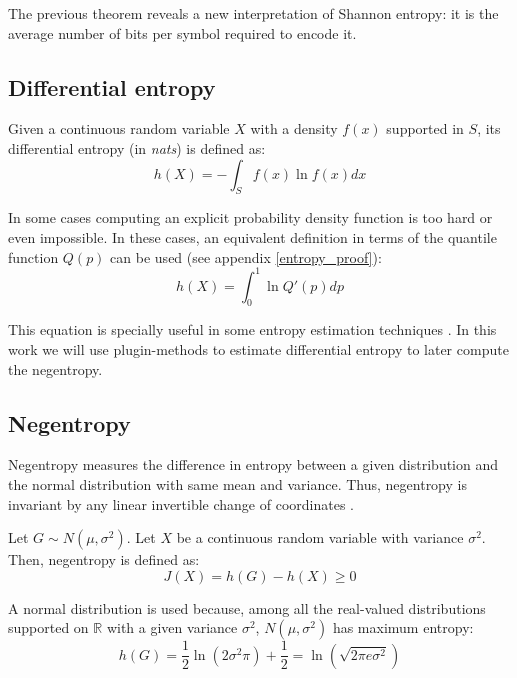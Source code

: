 The previous theorem reveals a new interpretation of Shannon entropy: it is the average number of bits per symbol required to encode it.

\subsection{Differential entropy}
Given a continuous random variable $X$ with a density $f(x)$ supported in $S$, its differential entropy (in \textit{nats}) is defined as:
\begin{equation} \label{eq:differential_entropy}
h(X) = - \int_{S}^{} f(x) \ln f(x) dx
\end{equation}

In some cases computing an explicit probability density function is too hard or even impossible. In these cases, an equivalent definition in terms of the quantile function $Q(p)$ can be used (see appendix \ref{entropy_proof}):
\begin{equation} \label{eq:differential_entropy_q}
h(X) = \int_{0}^{1} \ln Q'(p) dp
\end{equation}

This equation is specially useful in some entropy estimation techniques \parencite{Vasicek}. In this work we will use plugin-methods \parencite{EntropyEstimation} to estimate differential entropy to later compute the negentropy.

\subsection{Negentropy}
Negentropy measures the difference in entropy between a given distribution and the normal distribution with same mean and variance. Thus, negentropy is invariant by any linear invertible change of coordinates \parencite{negentropy}. 

Let $G \sim N(\mu, \sigma^2)$. Let $X$ be a continuous random variable with variance $\sigma^2$. Then, negentropy is defined as:
\begin{equation}
J(X) = h(G) - h(X) \geq 0
\end{equation}

A normal distribution is used because, among all the real-valued distributions supported on $\mathbb{R}$ with a given variance $\sigma^2$, $N(\mu, \sigma^2)$ has maximum entropy:
\begin{equation}
h(G) = \frac{1}{2} \ln \left(2\sigma^2\pi\right) + \frac{1}{2} = \ln\left(\sqrt{2\pi e \sigma^2}\right)
\end{equation}

